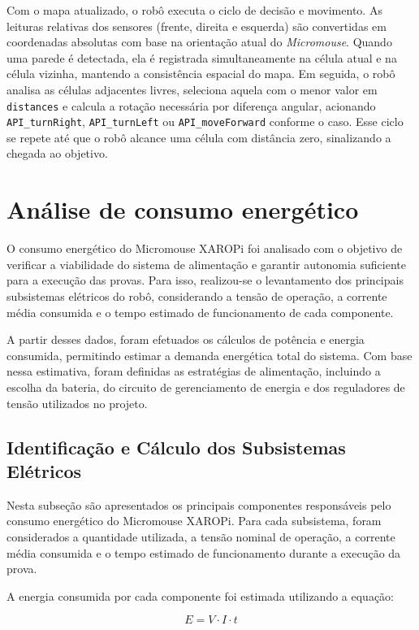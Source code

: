Com o mapa atualizado, o robô executa o ciclo de decisão e movimento. As leituras relativas dos sensores (frente, direita e esquerda) são convertidas em coordenadas absolutas com base na orientação atual do \textit{Micromouse}. Quando uma parede é detectada, ela é registrada simultaneamente na célula atual e na célula vizinha, mantendo a consistência espacial do mapa. Em seguida, o robô analisa as células adjacentes livres, seleciona aquela com o menor valor em \texttt{distances} e calcula a rotação necessária por diferença angular, acionando \texttt{API\_turnRight}, \texttt{API\_turnLeft} ou \texttt{API\_moveForward} conforme o caso. Esse ciclo se repete até que o robô alcance uma célula com distância zero, sinalizando a chegada ao objetivo.

\section{Análise de consumo energético}

O consumo energético do Micromouse XAROPi foi analisado com o objetivo de verificar a viabilidade do sistema de alimentação e garantir autonomia suficiente para a execução das provas. Para isso, realizou-se o levantamento dos principais subsistemas elétricos do robô, considerando a tensão de operação, a corrente média consumida e o tempo estimado de funcionamento de cada componente.

A partir desses dados, foram efetuados os cálculos de potência e energia consumida, permitindo estimar a demanda energética total do sistema. Com base nessa estimativa, foram definidas as estratégias de alimentação, incluindo a escolha da bateria, do circuito de gerenciamento de energia e dos reguladores de tensão utilizados no projeto.


\subsection{Identificação e Cálculo dos Subsistemas Elétricos}

Nesta subseção são apresentados os principais componentes responsáveis pelo consumo energético do Micromouse XAROPi. Para cada subsistema, foram considerados a quantidade utilizada, a tensão nominal de operação, a corrente média consumida e o tempo estimado de funcionamento durante a execução da prova.

A energia consumida por cada componente foi estimada utilizando a equação:

$$E = V \cdot I \cdot t$$


